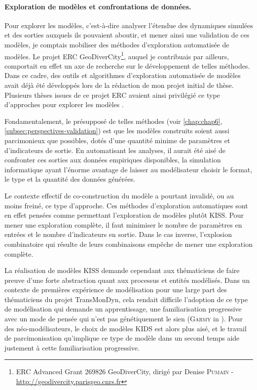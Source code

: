 \paragraph{Exploration de modèles et confrontations de données.}

Pour \og explorer les modèles\fg{}, c'est-à-dire analyser l'étendue des dynamiques simulées et des sorties auxquels ils pouvaient aboutir, et mener ainsi une validation de ces modèles, je comptais mobiliser des méthodes d'exploration automatisée de modèles.
Le projet ERC GeoDiverCity\footnote{
	ERC Advanced Grant 269826 GeoDiverCity, dirigé par Denise \textsc{Pumain} - \\ \href{http://geodivercity.parisgeo.cnrs.fr/blog/}{http://geodivercity.parisgeo.cnrs.fr}
}, auquel je contribuais par ailleurs, comportait en effet un axe de recherche sur le développement de telles méthodes.
Dans ce cadre, des outils et algorithmes d'exploration automatisée de modèles avait déjà été développés lors de la rédaction de mon projet initial de thèse.
Plusieurs thèses issues de ce projet ERC avaient ainsi privilégié ce type d'approches pour explorer les modèles \autocite{schmitt_modelisation_2014,cottineau_levolution_2014,rey-coyrehourcq_plateforme_2015}.

Fondamentalement, le présupposé de telles méthodes (voir \cref{chap:chap6}, \cref{subsec:perspectives-validation}) est que les modèles construits soient aussi parcimonieux que possibles, dotés d'une quantité minime de paramètres et d'indicateurs de sortie.
En automatisant les analyses, il aurait été aisé de confronter ces sorties aux données empiriques disponibles, la simulation informatique ayant l'énorme avantage de laisser au modélisateur choisir le format, le type et la quantité des données générées.

Le contexte effectif de co-construction du modèle a pourtant invalidé, ou au moins freiné, ce type d'approche.
Ces méthodes d'exploration automatiques sont en effet pensées comme permettant l'exploration de modèles plutôt KISS.
Pour mener une exploration complète, il faut minimiser le nombre de paramètres en entrées et le nombre d'indicateurs en sortie.
Dans le cas inverse, l'\og explosion combinatoire\fg{} qui résulte de leurs combinaisons empêche de mener une exploration complète.

La réalisation de modèles KISS demande cependant aux thématiciens de faire preuve d'une forte abstraction quant aux processus et entités modélisés.
Dans un contexte de premières expérience de modélisation pour une large part des thématiciens du projet TransMonDyn, cela rendait difficile l'adoption de ce type de modélisation qui demande \og un apprentissage, une familiarisation progressive avec un mode de pensée qui n'est pas génétiquement le sien\fg{} (\textsc{Garmy} in \cite[477]{ouriachi_lelaboration_2017}).
Pour des néo-modélisateurs, le choix de modèles KIDS est alors plus aisé, et le travail de \og parcimonisation\fg{} qu'implique ce type de modèle dans un second temps aide justement à cette \og familiarisation progressive\fg{}.

